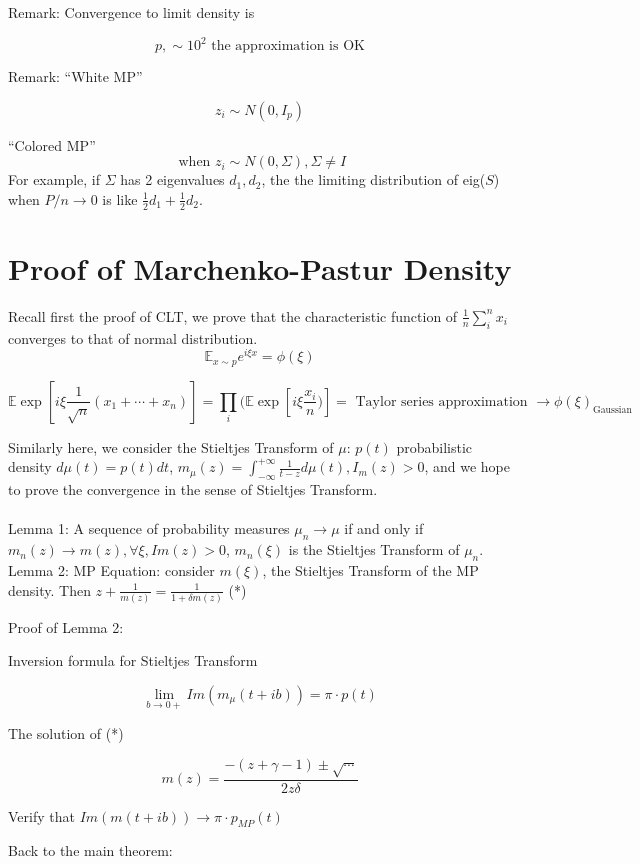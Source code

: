 \documentclass[12pt]{article}
\theoremstyle{plain}
\begin{document}
Remark: Convergence to limit density is 

$$ p , \sim 10^2 \text{  the approximation is OK} $$

Remark: ``White MP''

$$ z_i \sim N(0, I_p) $$



``Colored MP''
$$ \text{ when } z_i \sim N(0, \Sigma), \Sigma \neq I $$
For example, if $\Sigma$ has 2 eigenvalues $d_1, d_2$, the the limiting distribution of eig($S$) when $P/n \rightarrow 0$ is like $\frac{1}{2}d_1 + \frac{1}{2} d_2$.

\section*{Proof of Marchenko-Pastur Density}
Recall first the proof of CLT, we prove that the characteristic function of $\frac{1}{n}\sum_i^n x_i$ converges to that of normal distribution.
$$ \mathbb{E}_{x \sim p} e^{i \xi x} = \phi(\xi) $$

$$ \mathbb{E} \exp[i \xi \frac{1}{\sqrt{n}} (x_1 + \cdots + x_n)] = \prod_i ( \mathbb{E} \exp[i \xi \frac{x_i}{n})] = \text{ Taylor series approximation } \rightarrow \phi(\xi)_{\text{Gaussian}} $$

Similarly here, we consider the Stieltjes Transform of $\mu$: $p(t)$ probabilistic density $d \mu(t) = p(t) dt$, $m_\mu(z) = \int_{-\infty}^{+\infty} \frac{1}{t-z} d \mu(t), I_m(z) > 0$, and we hope to prove the convergence in the sense of Stieltjes Transform.\\
\\
Lemma 1: A sequence of probability measures $\mu_n \rightarrow \mu$ if and only if $m_n(z) \rightarrow m(z), \forall \xi, Im(z) > 0$, $m_n(\xi)$ is the Stieltjes Transform of $\mu_n$.\\
Lemma 2: MP Equation: consider $m(\xi)$, the Stieltjes Transform of the MP density. Then $ z + \frac{1}{m(z)} = \frac{1}{1+\delta m(z)}$ (*)

Proof of Lemma 2:

Inversion formula for Stieltjes Transform

$$ \lim_{b \rightarrow 0+} Im ( m_\mu (t + ib)) = \pi \cdot p(t) $$

The solution of (*)

$$ m(z) = \frac{-(z+ \gamma -1) \pm \sqrt{ \cdots}}{2 z \delta} $$

Verify that $Im(m(t+ib)) \rightarrow \pi \cdot p_{MP}(t)$

Back to the main theorem:
\end{document}
